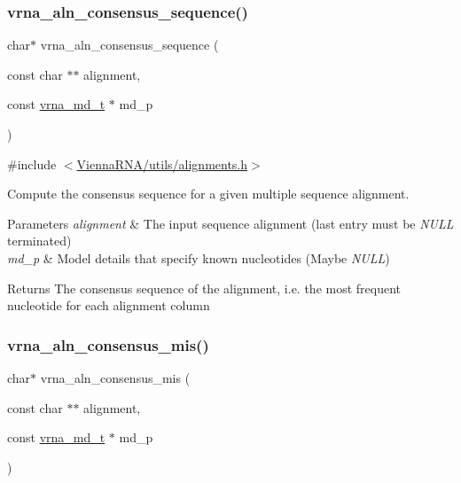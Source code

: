 \subsubsection{\texorpdfstring{vrna\+\_\+aln\+\_\+consensus\+\_\+sequence()}{vrna\_aln\_consensus\_sequence()}}
{\footnotesize\ttfamily char$\ast$ vrna\+\_\+aln\+\_\+consensus\+\_\+sequence (\begin{DoxyParamCaption}\item[{const char $\ast$$\ast$}]{alignment,  }\item[{const \hyperlink{group__model__details_ga1f8a10e12a0a1915f2a4eff0b28ea17c}{vrna\+\_\+md\+\_\+t} $\ast$}]{md\+\_\+p }\end{DoxyParamCaption})}



{\ttfamily \#include $<$\hyperlink{utils_2alignments_8h}{Vienna\+R\+N\+A/utils/alignments.\+h}$>$}



Compute the consensus sequence for a given multiple sequence alignment. 


\begin{DoxyParams}{Parameters}
{\em alignment} & The input sequence alignment (last entry must be {\itshape N\+U\+LL} terminated) \\
\hline
{\em md\+\_\+p} & Model details that specify known nucleotides (Maybe {\itshape N\+U\+LL}) \\
\hline
\end{DoxyParams}
\begin{DoxyReturn}{Returns}
The consensus sequence of the alignment, i.\+e. the most frequent nucleotide for each alignment column 
\end{DoxyReturn}
\mbox{\label{group__aln__utils_gad9e74f6549e819f5f330a06d57d45f2a}} 
\subsubsection{\texorpdfstring{vrna\+\_\+aln\+\_\+consensus\+\_\+mis()}{vrna\_aln\_consensus\_mis()}}
{\footnotesize\ttfamily char$\ast$ vrna\+\_\+aln\+\_\+consensus\+\_\+mis (\begin{DoxyParamCaption}\item[{const char $\ast$$\ast$}]{alignment,  }\item[{const \hyperlink{group__model__details_ga1f8a10e12a0a1915f2a4eff0b28ea17c}{vrna\+\_\+md\+\_\+t} $\ast$}]{md\+\_\+p }\end{DoxyParamCaption})}




